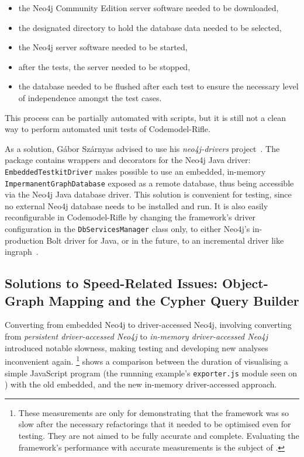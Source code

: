 \begin{itemize}
\item the Neo4j Community Edition server software needed to be downloaded,
\item the designated directory to hold the database data needed to be selected,
\item the Neo4j server software needed to be started,
\item after the tests, the server needed to be stopped,
\item the database needed to be flushed after each test to ensure the necessary level of independence amongst the test cases.
\end{itemize}

This process can be partially automated with scripts, but it is still not a clean way to perform automated unit tests of Codemodel-Rifle.

As a solution, Gábor Szárnyas advised to use his \emph{neo4j-drivers} project~\cite{neo4j-drivers}. The package contains wrappers and decorators for the Neo4j Java driver: \lstinline{EmbeddedTestkitDriver} makes possible to use an embedded, in-memory \lstinline{ImpermanentGraphDatabase} exposed as a remote database, thus being accessible via the Neo4j Java database driver. This solution is convenient for testing, since no external Neo4j database needs to be installed and run. It is also easily reconfigurable in Codemodel-Rifle by changing the framework's driver configuration in the \lstinline{DbServicesManager} class only, to either Neo4j's in-production Bolt driver for Java, or in the future, to an incremental driver like ingraph~\cite{ingraph-github}.


\subsection{Solutions to Speed-Related Issues: Object-Graph Mapping and the Cypher Query Builder}

Converting from embedded Neo4j to driver-accessed Neo4j, involving converting from \emph{persistent driver-accessed Neo4j} to \emph{in-memory driver-accessed Neo4j} introduced notable slowness, making testing and developing new analyses inconvenient again. \footnote{These measurements are only for demonstrating that the framework was so slow after the necessary refactorings that it needed to be optimised even for testing. They are not aimed to be fully accurate and complete. Evaluating the framework's performance with accurate measurements is the subject of .} shows a comparison between the duration of visualising a simple JavaScript program (the runnning example's \lstinline{exporter.js} module seen on ) with the old embedded, and the new in-memory driver-accessed approach.

